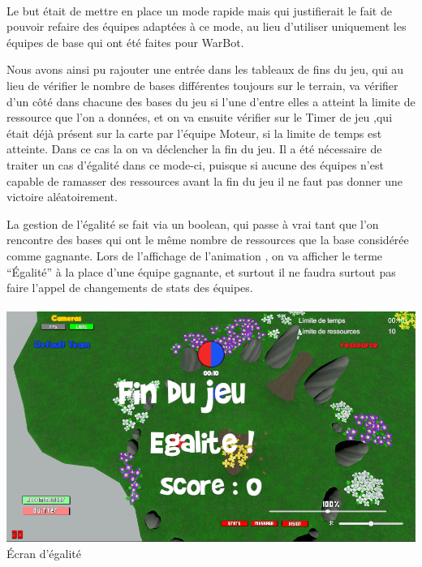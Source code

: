 \documentclass{report}
\begin{document}
\paragraph{}


Le but était de mettre en place un mode rapide mais qui justifierait le fait de pouvoir refaire des équipes adaptées à ce mode, au lieu d’utiliser uniquement les équipes de base qui ont été faites pour WarBot.

Nous avons ainsi pu rajouter une entrée dans les tableaux de fins du jeu, qui au lieu de vérifier le nombre de bases différentes toujours sur le terrain, va vérifier d’un côté dans chacune des bases du jeu si l’une d’entre elles a atteint la limite de ressource que l’on a données, et on va ensuite vérifier sur le Timer de jeu ,qui était déjà présent sur la carte par l’équipe Moteur, si la limite de temps est atteinte. Dans ce cas la on va déclencher la fin du jeu.
Il a été nécessaire de traiter un cas d’égalité dans ce mode-ci, puisque si aucune des équipes n’est capable de ramasser des ressources avant la fin du jeu il ne faut pas donner une victoire aléatoirement. 

La gestion de l’égalité se fait via un boolean, qui passe à vrai tant que l’on rencontre des bases qui ont le même nombre de ressources que la base considérée comme gagnante. 
Lors de l’affichage de l’animation , on va afficher le terme “Égalité” à la place d’une équipe gagnante, et surtout il ne faudra surtout pas faire l’appel de changements de stats des équipes.
\paragraph{}
\begin{center}
\includegraphics[scale=0.5]{DATA/egalite.png}
 {Écran d’égalité}
\end{center}
\end{document}
